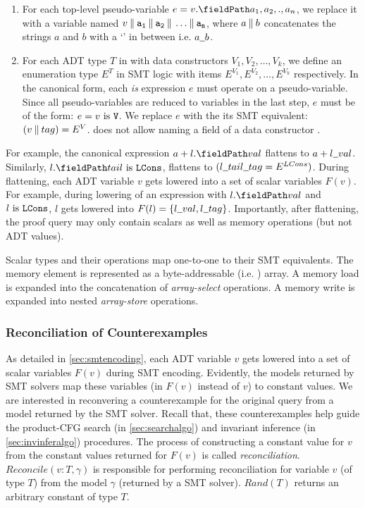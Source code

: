\begin{enumerate}
\item For each top-level pseudo-variable $e = \prodAccess{v}{a_1,a_2,.,a_n}$, we replace it with a
variable named $v \mathbin\Vert{} {\tt a_1} \mathbin\Vert{} {\tt a_2} \mathbin\Vert{} \dots \mathbin\Vert{} {\tt a_n}$,
where $a \mathbin\Vert{} b$ concatenates the strings $a$ and $b$ with a `\strsep{}' in between i.e. $a \strsep{} b$.

\item For each ADT type $T$ in \SpecL{} with data constructors $V_1,V_2,\dots,V_k$,
we define an enumeration type $E^T$ in SMT logic with items $E^{V_1},E^{V_2},\dots,E^{V_k}$ respectively.
In the canonical form, each {\em is} expression $e$ must operate on a pseudo-variable.
Since all pseudo-variables are reduced to variables in the last step, $e$ must be of the form: $e = v\ \mathrm{is}\ {\tt V}$.
We replace $e$ with the its SMT equivalent: $(v \mathbin\Vert{} tag) = E^V$.
\SpecL{} does not allow naming a field of a data constructor .
\end{enumerate}

\noindent For example, the canonical expression $a + \prodAccess{l}{val}$ flattens to $a + l \strsep{} val$.
Similarly, $\sumIs{\prodAccess{l}{tail}}{LCons}$, flattens to $(l \strsep{} tail \strsep{} tag = E^{LCons})$.
During flattening, each ADT variable $v$ gets lowered into a set of scalar variables $F(v)$.
For example, during lowering of an expression with $\prodAccess{l}{val}$ and $l\ \mathrm{is}\ {\tt LCons}$,
$l$ gets lowered into $F(l) = \{ l \strsep{} val, l \strsep{} tag \}$.
Importantly, after flattening, the proof query may only contain scalars as well as memory operations
(but not ADT values).

Scalar types and their operations map one-to-one to their SMT equivalents.
The memory element \mem{} is represented as a byte-addressable (i.e. ) array.
A memory load  is expanded into the concatenation of  {\em array-select} operations.
A memory write  is expanded into  nested {\em array-store} operations.

\subsubsection{Reconciliation of Counterexamples}
\label{sec:cerecons}
As detailed in \cref{sec:smtencoding}, each ADT variable $v$ gets lowered into a set of scalar
variables $F(v)$ during SMT encoding.
Evidently, the models returned by SMT solvers map these variables (in $F(v)$ instead of $v$)
to constant values.
We are interested in reconvering a counterexample for the original query from a
model returned by the SMT solver.
Recall that, these counterexamples help guide the product-CFG search (in \cref{sec:searchalgo})
and invariant inference (in \cref{sec:invinferalgo}) procedures.
The process of constructing a constant value for $v$ from the constant values returned for $F(v)$
is called {\em reconciliation}.
$Reconcile(v:T, \gamma)$ is responsible for performing reconciliation for variable $v$ (of type $T$)
from the model $\gamma$ (returned by a SMT solver).
$Rand(T)$ returns an arbitrary constant of type $T$.



